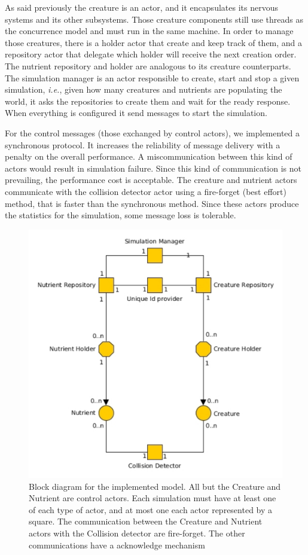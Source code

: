 \documentclass[runningheads]{llncs}
\begin{document}
As said previously the creature is an actor, and it encapsulates its nervous systems and its other subsystems. Those creature components still use threads as the concurrence model and must run in the same machine. In order to manage those creatures, there is a holder actor that create and keep track of them, and a repository actor that delegate which holder will receive the next creation order. The nutrient repository and holder are analogous to its creature counterparts. The simulation manager is an actor responsible to create, start and stop a given simulation, \textit{i.e.}, given how many creatures and nutrients are populating the world, it asks the repositories to create them and wait for the ready response. When everything is configured it send messages to start the simulation.

For the control messages (those exchanged by control actors), we implemented a synchronous protocol. It increases the reliability of message delivery with a penalty on the overall performance. A miscommunication between this kind of actors would result in simulation failure. Since this kind of communication is not prevailing, the performance cost is acceptable. The creature and nutrient actors communicate with the collision detector actor using a fire-forget (best effort) method, that is faster than the synchronous method. Since these actors produce the statistics for the simulation, some message loss is tolerable.


\begin{figure}
	\centering
	\includegraphics[width=14cm]{images/diagramaAtores}
	\caption{Block diagram for the implemented model. All but the Creature and Nutrient are control actors. Each simulation must have at least one of each type of actor, and at most one each actor represented by a square. The communication between the Creature and Nutrient actors with the Collision detector are fire-forget. The other communications have a acknowledge mechanism}
	\label{diagramaAtores}
\end{figure}
\end{document}
